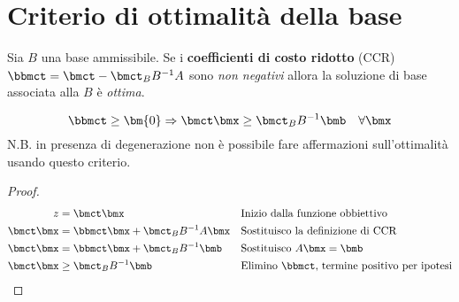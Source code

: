 \documentclass[\main/main.tex]{subfiles}
\begin{document}
\section{Criterio di ottimalità della base}
\begin{theorem}
  Sia $B$ una base ammissibile. Se i \textbf{coefficienti di costo ridotto} (CCR) $\bbmct = \bmct - \bmct_B B^{-1} A$ sono \textit{non negativi} allora la soluzione di base associata alla $B$ è \textit{ottima}.

  \[
    \bbmct \geq \bm{0} \Rightarrow \bmct \bmx \geq \bmct_B B^{-1}\bmb \quad \forall \bmx
  \]
  N.B. in presenza di degenerazione non è possibile fare affermazioni sull'ottimalità usando questo criterio.
\end{theorem}


\begin{proof}
  \begin{align*}
    z          & =\bmct \bmx                         &  & \text{Inizio dalla funzione obbiettivo}               \\
    \bmct \bmx & = \bbmct\bmx + \bmct_B B^{-1} A\bmx &  & \text{Sostituisco la definizione di CCR}              \\
    \bmct \bmx & = \bbmct\bmx + \bmct_B B^{-1} \bmb  &  & \text{Sostituisco $A\bmx = \bmb$}                     \\
    \bmct \bmx & \geq \bmct_B B^{-1} \bmb            &  & \text{Elimino $\bbmct$, termine positivo per ipotesi}
  \end{align*}
\end{proof}
\end{document}
